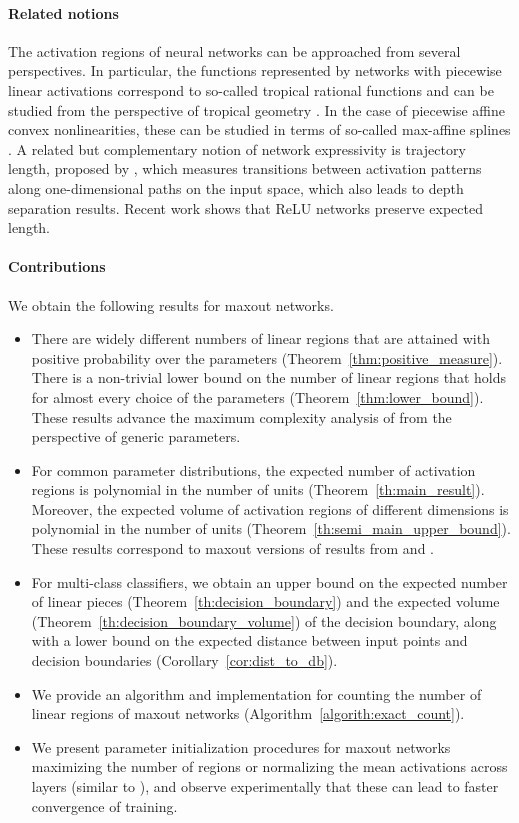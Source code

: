 \documentclass{article}
\theoremstyle{definition}
\begin{document}
\paragraph{Related notions}
The activation regions of neural networks can be approached from several perspectives. 
In particular, the functions represented by networks with piecewise linear activations correspond to so-called tropical rational functions and can be studied from the perspective of tropical geometry \citep{zhang2018tropical, charisopoulos2018tropical}.
In the case of piecewise affine convex nonlinearities, these can be studied in terms of so-called max-affine splines \citep{NIPS2019_9712}.
A related but complementary notion of network expressivity is trajectory length, proposed by \citet{raghu2017expressive}, which measures transitions between activation patterns along one-dimensional paths on the input space, which also leads to depth separation results. 
Recent work \citep{hanin2021deep} shows that ReLU networks preserve expected length. 

\paragraph{Contributions} 
We obtain the following results for maxout networks.
\begin{itemize}[leftmargin=*]
\itemsep.01em 
    \item There are widely different numbers of linear regions that are attained with positive probability over the parameters (Theorem~\ref{thm:positive_measure}). 
    There is a non-trivial lower bound on the number of linear regions that holds for almost every choice of the parameters (Theorem~\ref{thm:lower_bound}). 
    These results advance the maximum complexity analysis of \citet{sharp2021} from the perspective of generic parameters. 
    \item For common parameter distributions, the expected number of activation regions is polynomial in the number of units (Theorem~\ref{th:main_result}). 
    Moreover, the expected volume of activation regions of different dimensions is polynomial in the number of units (Theorem~\ref{th:semi_main_upper_bound}). 
    These results correspond to maxout versions of results from \citet{NIPS2019_8328} and \citet{pmlr-v97-hanin19a}. 
    \item For multi-class classifiers, we obtain an upper bound on the expected number of linear pieces (Theorem~\ref{th:decision_boundary}) and the expected volume (Theorem~\ref{th:decision_boundary_volume}) of the decision boundary, along with a lower bound on the expected distance between input points and decision boundaries (Corollary~\ref{cor:dist_to_db}). 
    \item We provide an algorithm and implementation for counting the number of linear regions of maxout networks (Algorithm~\ref{algorith:exact_count}).  
    \item We present parameter initialization procedures for maxout networks maximizing the number of regions or normalizing the mean activations across layers (similar to \citealt{glorot2010understanding,he2015delving}), and observe experimentally that these can lead to faster convergence of training. 
\end{itemize}
\end{document}
